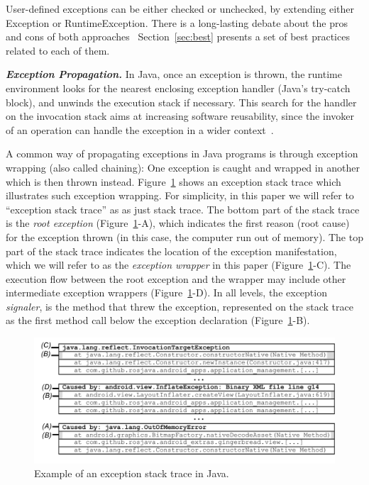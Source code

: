\documentclass[conference]{IEEEtran}
\begin{document}
User-defined exceptions can be either checked
 or unchecked, by extending either Exception or RuntimeException. There is a long-lasting debate 
about the pros and cons of both approaches~\cite{javatut,stackoverlow,debate}
Section~\ref{sec:best} presents
a set of best practices related to each of them.


\emph{\textbf{Exception Propagation.}} In Java, once an exception is thrown, 
the runtime environment looks for the nearest enclosing exception handler
(Java's try-catch block), and unwinds the execution stack if necessary.
This search for the handler on the invocation stack aims at increasing software reusability, 
since the invoker of an operation can handle the exception in a wider context~\cite{miller1997issues}.

 A common way of  propagating exceptions in Java programs is through
 exception wrapping (also called chaining):
One exception 
is caught and wrapped in another which is then thrown instead. Figure~\ref{fig:wrapping} shows 
an exception stack trace which illustrates such exception wrapping. 
For simplicity, in this paper we will refer to ``exception stack trace'' as as just stack trace.
The bottom part of the stack trace is the \emph{root exception} (Figure~\ref{fig:wrapping}-A), which indicates
the first reason (root cause) for the exception thrown (in this case, the computer run out of
memory). The top part of the stack trace indicates the location of the exception
manifestation, which we will refer to as the \emph{exception wrapper} in this paper (Figure~\ref{fig:wrapping}-C). The
execution flow  between the root exception and the wrapper may
include other intermediate exception wrappers (Figure~\ref{fig:wrapping}-D). In all levels, the exception
\emph{signaler}, is the method that threw the exception, represented on the
stack trace as the first method call below the exception declaration (Figure~\ref{fig:wrapping}-B).

\begin{figure} \centering \includegraphics[scale=0.55]{stack_review6.png}
\caption{Example of an exception stack trace in Java.}
\label{fig:wrapping}
\end{figure}
\end{document}
